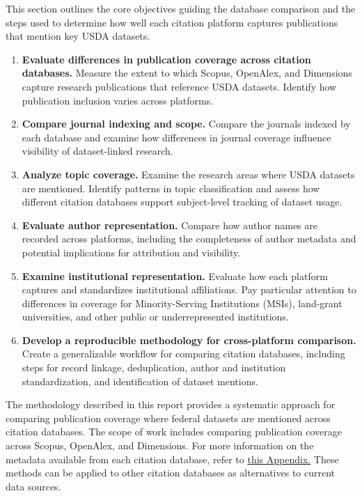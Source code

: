 \documentclass[
  letterpaper,
  DIV=11,
  numbers=noendperiod]{scrartcl}
\begin{document}
This section outlines the core objectives guiding the database
comparison and the steps used to determine how well each citation
platform captures publications that mention key USDA datasets.

\begin{enumerate}
\def\labelenumi{\arabic{enumi}.}
\item
  \textbf{Evaluate differences in publication coverage across citation
  databases.} Measure the extent to which Scopus, OpenAlex, and
  Dimensions capture research publications that reference USDA datasets.
  Identify how publication inclusion varies across platforms.
\item
  \textbf{Compare journal indexing and scope.} Compare the journals
  indexed by each database and examine how differences in journal
  coverage influence visibility of dataset-linked research.
\item
  \textbf{Analyze topic coverage.} Examine the research areas where USDA
  datasets are mentioned. Identify patterns in topic classification and
  assess how different citation databases support subject-level tracking
  of dataset usage.
\item
  \textbf{Evaluate author representation.} Compare how author names are
  recorded across platforms, including the completeness of author
  metadata and potential implications for attribution and visibility.
\item
  \textbf{Examine institutional representation.} Evaluate how each
  platform captures and standardizes institutional affiliations. Pay
  particular attention to differences in coverage for Minority-Serving
  Institutions (MSIs), land-grant universities, and other public or
  underrepresented institutions.
\item
  \textbf{Develop a reproducible methodology for cross-platform
  comparison.} Create a generalizable workflow for comparing citation
  databases, including steps for record linkage, deduplication, author
  and institution standardization, and identification of dataset
  mentions.
\end{enumerate}

The methodology described in this report provides a systematic approach
for comparing publication coverage where federal datasets are mentioned
across citation databases. The scope of work includes comparing
publication coverage across Scopus, OpenAlex, and Dimensions. For more
information on the metadata available from each citation database, refer
to
\href{https://laurenchenarides.github.io/compare_scopus_openalex_report/appendices/app_crosswalk.html}{this
Appendix.} These methods can be applied to other citation databases as
alternatives to current data sources.
\end{document}
